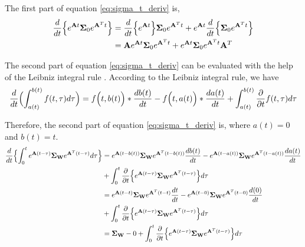 \documentclass{article}
\begin{document}
The first part of equation \ref{eq:sigma_t_deriv} is,
\begin{equation}
\begin{aligned}
\frac{d}{dt} \Bigl \{ e^{\mathbf{A}t} \mathbf{\Sigma}_0 e^{\mathbf{A}^Tt} \Bigr \} &=
\frac{d}{dt} \Bigl \{ e^{\mathbf{A}t} \Bigr \} \mathbf{\Sigma}_0 e^{\mathbf{A}^Tt}  + e^{\mathbf{A}t} \frac{d}{dt} \Bigl \{ \mathbf{\Sigma}_0 e^{\mathbf{A}^Tt}  \Bigr \} \\
&=\mathbf{A} e^{\mathbf{A}t} \mathbf{\Sigma}_0 e^{\mathbf{A}^Tt}+ e^{\mathbf{A}t} \mathbf{\Sigma}_0 e^{\mathbf{A}^Tt} \mathbf{A}^T
\end{aligned}
\label{eq:sigma_t_part1}
\end{equation}

The second part of equation \ref{eq:sigma_t_deriv} can be evaluated with the help of the Leibniz integral rule \citep{Flanders1973}. According to the Leibniz integral rule, we have
\begin{equation}
\frac{d}{dt} \Bigl( \int_{a(t)}^{b(t)} f(t, \tau) d \tau \Bigr)=
f \Bigl(t,b(t) \Bigr) * \frac{db(t)}{dt}  -
f \Bigl( t, a(t) \Bigr) * \frac{da(t)}{dt}  + \int_{a(t)}^{b(t)} \frac{\partial}{\partial t} f(t, \tau) d \tau
\end{equation}

Therefore, the second part of equation \ref{eq:sigma_t_deriv} is, where $a(t)=0$ and $b(t)=t$.
\begin{equation}
    \begin{aligned}
\frac{d}{dt} \Bigl \{ \int_0^t e^{\mathbf{A}(t-\tau)}  \mathbf{\Sigma}_\mathbf{W}  e^{\mathbf{A}^T(t-\tau)} d\tau \Bigr \}
&=e^{\mathbf{A}(t-b(t))}  \mathbf{\Sigma}_\mathbf{W}  e^{\mathbf{A}^T(t-b(t))} \frac{db(t)}{dt} -
e^{\mathbf{A}(t-a(t))}  \mathbf{\Sigma}_\mathbf{W}  e^{\mathbf{A}^T(t-a(t))} \frac{da(t)}{dt}  \\
& +
\int_0^t \frac{\partial}{\partial t} \Bigl \{ e^{\mathbf{A}(t-\tau)}  \mathbf{\Sigma}_\mathbf{W}  e^{\mathbf{A}^T(t-\tau)} \Bigr \} d\tau \\
&=e^{\mathbf{A}(t-t)}  \mathbf{\Sigma}_\mathbf{W}  e^{\mathbf{A}^T(t-t)} \frac{dt}{dt} -
e^{\mathbf{A}(t-0)}  \mathbf{\Sigma}_\mathbf{W}  e^{\mathbf{A}^T(t-0)} \frac{d(0)}{dt}  \\
& +
\int_0^t \frac{\partial}{\partial t} \Bigl \{ e^{\mathbf{A}(t-\tau)}  \mathbf{\Sigma}_\mathbf{W}  e^{\mathbf{A}^T(t-\tau)} \Bigr \} d\tau  \\
&=\mathbf{\Sigma}_\mathbf{W} - 0 + \int_0^t \frac{\partial}{\partial t} \Bigl \{ e^{\mathbf{A}(t-\tau)}  \mathbf{\Sigma}_\mathbf{W}  e^{\mathbf{A}^T(t-\tau)} \Bigr \} d\tau
    \end{aligned}
\label{eq:sigma_t_part2}
\end{equation}
 
\end{document}
